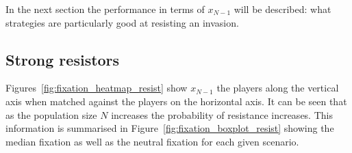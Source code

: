 \documentclass{article}
\begin{document}
In the next section the performance in terms of \(x_{N-1}\) will be described:
what strategies are particularly good at resisting an invasion.

\subsection{Strong resistors}\label{sec:strong_resistors}

Figures~\ref{fig:fixation_heatmap_resist} show \(x_{N-1}\)
the players along the vertical axis when matched against the players on the
horizontal axis. It can be seen that as the population size \(N\) increases the
probability of resistance increases.
This information is summarised in Figure~\ref{fig:fixation_boxplot_resist}
showing the median fixation as well as the neutral fixation for each given
scenario.
\end{document}
